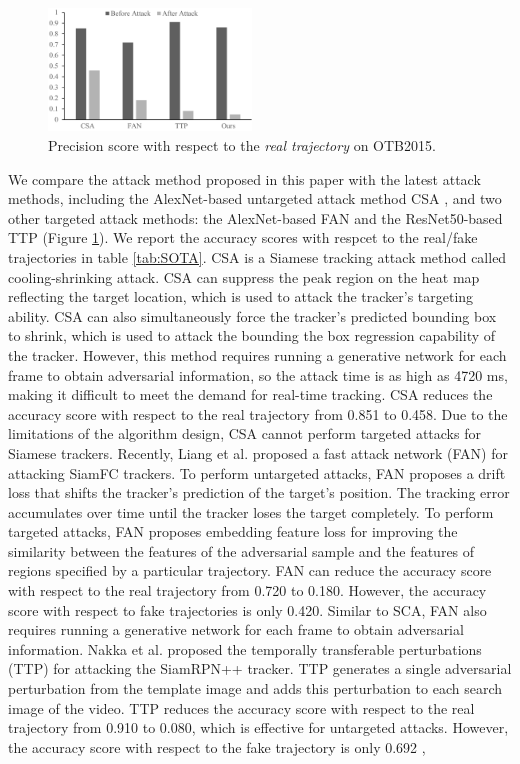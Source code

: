 \documentclass[journal]{IEEEtran}
\begin{document}
\begin{figure}[t]
  \begin{center}
    \includegraphics[width=0.48\textwidth]{images/SOTA.pdf}
  \end{center}
  \caption{Precision score with respect to the \textit{real trajectory} on OTB2015.}
  \label{fig:SOTA}
\end{figure}

We compare the attack method proposed in this paper with the latest attack methods, including the AlexNet-based untargeted attack method CSA \cite{CSA}, and two other targeted attack methods: the AlexNet-based FAN \cite{FAN} and the ResNet50-based TTP \cite{TTP} (Figure \ref{fig:SOTA}). We report the accuracy scores with respcet to the real/fake trajectories in table \ref{tab:SOTA}. CSA \cite{CSA} is a Siamese tracking attack method called cooling-shrinking attack. CSA can suppress the peak region on the heat map reflecting the target location, which is used to attack the tracker's targeting ability. CSA can also simultaneously force the tracker's predicted bounding box to shrink, which is used to attack the bounding the box regression capability of the tracker. However, this method requires running a generative network for each frame to obtain adversarial information, so the attack time is as high as 4720 ms, making it difficult to meet the demand for real-time tracking. CSA reduces the accuracy score with respect to the real trajectory from 0.851 to 0.458. Due to the limitations of the algorithm design, CSA cannot perform targeted attacks for Siamese trackers. Recently, Liang et al. proposed a fast attack network (FAN) \cite{FAN} for attacking SiamFC trackers. To perform untargeted attacks, FAN proposes a drift loss that shifts the tracker's prediction of the target's position. The tracking error accumulates over time until the tracker loses the target completely. To perform targeted attacks, FAN proposes embedding feature loss for improving the similarity between the features of the adversarial sample and the features of regions specified by a particular trajectory. FAN can reduce the accuracy score with respect to the real trajectory from 0.720 to 0.180. However, the accuracy score with respect to fake trajectories is only 0.420. Similar to SCA, FAN also requires running a generative network for each frame to obtain adversarial information. Nakka et al. \cite{TTP} proposed the temporally transferable perturbations (TTP) for attacking the SiamRPN++ tracker. TTP generates a single adversarial perturbation from the template image and adds this perturbation to each search image of the video. TTP reduces the accuracy score with respect to the real trajectory from 0.910 to 0.080, which is effective for untargeted attacks. However, the accuracy score with respect to the fake trajectory is only 0.692 , 
\end{document}
